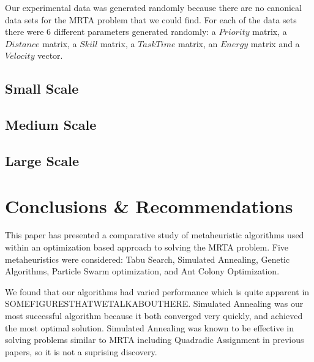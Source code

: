 \documentclass[a4paper]{article}
\begin{document}
Our experimental data was generated randomly because there are no canonical data sets for the MRTA problem that we could find. For each of the data sets there were 6 different parameters generated randomly: a $\mathit{Priority}$ matrix, a $\mathit{Distance}$ matrix, a $\mathit{Skill}$ matrix, a $\mathit{Task Time}$ matrix, an $\mathit{Energy}$ matrix and a $\mathit{Velocity}$ vector.

\subsection{Small Scale}

\subsection{Medium Scale}

\subsection{Large Scale}

\section{Conclusions \& Recommendations}


This paper has presented a comparative study of metaheuristic algorithms used within an optimization based approach to solving the MRTA problem. Five metaheuristics were considered: Tabu Search, Simulated Annealing, Genetic Algorithms, Particle Swarm optimization, and Ant Colony Optimization.

We found that our algorithms had varied performance which is quite apparent in SOMEFIGURESTHATWETALKABOUTHERE. Simulated Annealing was our most successful algorithm because it both converged very quickly, and achieved the most optimal solution. Simulated Annealing was known to be effective in solving problems similar to MRTA including Quadradic Assignment in previous papers, so it is not a suprising discovery\cite{Badreldin}.
\end{document}
